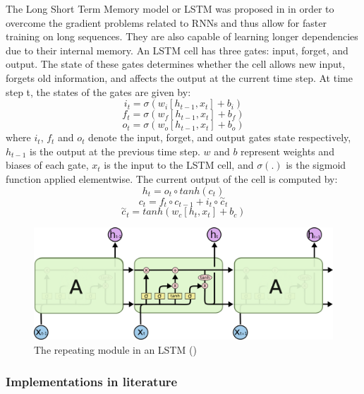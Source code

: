 The Long Short Term Memory model or LSTM was proposed in  in order to overcome the gradient problems related to RNNs and thus allow for faster training on long sequences.
They are also capable of learning longer dependencies due to their internal memory. An LSTM cell has three gates: input, forget, and output.
The state of these gates determines whether the cell allows new input, forgets old information, and affects the output at the current time step.
At time step t, the states of the gates are given by:
\begin{equation}
    i_t=\sigma(w_i[h_{t-1},x_t]+b_i)
\end{equation}
\begin{equation}
    f_t=\sigma(w_f[h_{t-1},x_t]+b_f)
\end{equation}
\begin{equation}
    o_t=\sigma(w_o[h_{t-1},x_t]+b_o)
\end{equation}
where $i_t$, $f_t$ and $o_t$ denote the input, forget, and output gates state respectively, $h_{t-1}$ is the output at the previous time step.
$w$ and $b$ represent weights and biases of each gate, $x_t$ is the input to the LSTM cell, and $\sigma (.)$ is the sigmoid function applied elementwise.
The current output of the cell is computed by:
\begin{equation}
    h_t=o_t \circ tanh(c_t)
\end{equation}
\begin{equation}
    c_t = f_t \circ c_{t-1}+i_t \circ \overset{\sim}{c}_t
\end{equation}
\begin{equation}
    \overset{\sim}{c}_t = tanh(w_c[h_t,x_t]+b_c)
\end{equation}

\begin{figure}
    \centering
    \includegraphics[width=0.8\columnwidth]{Figures/LSTM}
    \decoRule
    \caption{The repeating module in an LSTM (\cite{oinkina})}
    \label{fig:LSTM}
\end{figure}

\subsubsection{Implementations in literature}

